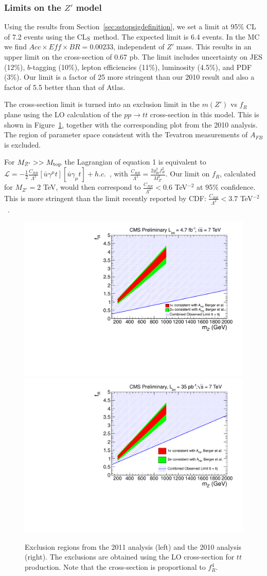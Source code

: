\subsubsection{Limits on the $Z'$ model}
\label{sec:sstopslimits}
Using the results from Section~\ref{sec:sstopsigdefinition}, we set 
a limit at 95\% CL of 7.2 events using the CL$_{\rm S}$ method.
The expected limit is 6.4 events.
In the MC we find $Acc \times Eff \times BR = 0.00233$, independent of $Z'$ mass. 
This results in an upper limit on the cross-section of 0.67 pb.
The limit includes uncertainty
on JES (12\%), $b$-tagging (10\%), lepton efficiencies (11\%), luminosity (4.5\%),
and PDF (3\%).
Our limit is a factor of 25 more stringent than our
2010 result\cite{sstop} and also a factor of 5.5 better
than that of Atlas\cite{sstopatlas}.

The cross-section limit is turned into an exclusion limit in the $m(Z')$ vs $f_R$
plane using the LO calculation of the $pp \to tt$ cross-section in this model.
This is shown in Figure~\ref{fig:sstopexclusion}, together with the corresponding
plot from the 2010 analysis.  The region of parameter space consistent 
with the Tevatron measurements of $A_{FB}$ is excluded.


For $M_{Z'} >> M_{\rm top}$ the Lagrangian of equation 1 is 
equivalent to 
$\mathcal{L} = -\frac{1}{2}\frac{C_{RR}}{\Lambda^2}
 [\bar{u} \gamma^\mu t][\bar{u} \gamma_{\mu} t] + h.c.$~\cite{cdfth2},
with $\frac{C_{RR}}{\Lambda^2} = \frac{2 g_W^2 f_R^2}{M_{Z'}^2}$.
 Our limit on $f_R$, calculated for $M_{Z'}=2$ TeV, 
would then correspond to $\frac{C_{RR}}{\Lambda^2} < 0.6$ TeV$^{-2}$ at 
95\% confidence.  This is more stringent than the limit recently reported
by CDF: $\frac{C_{RR}}{\Lambda^2} < 3.7$ TeV$^{-2}$~\cite{cdflimit}.


\begin{figure}[htb]
\begin{center}
\includegraphics[width=0.45\linewidth]{figs/zprimecombined.pdf}
\includegraphics[width=0.45\linewidth]{figs/sscomb.pdf}
\caption{Exclusion regions from the 2011 analysis (left) and the 2010 analysis (right).
The exclusions are obtained using the LO cross-section for $tt$ production.  
Note that the cross-section is proportional to $f_R^4$.
\label{fig:sstopexclusion}}
\end{center}
\end{figure}


